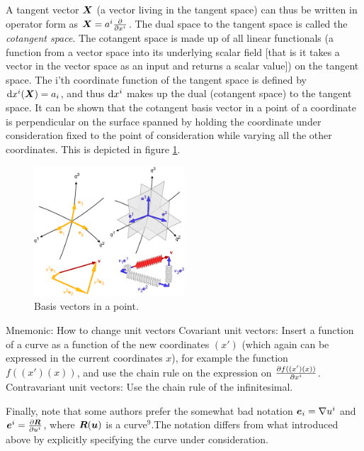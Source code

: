 \documentclass[a4paper, 12pt]{article}
\begin{document}
A tangent vector $\boldsymbol{X}$ (a vector living in the tangent space) can thus be 
written in operator form as $\boldsymbol{X}=a^i\frac{\partial {}}{\partial{x^{i}}}$. The dual space to 
the tangent space is called the \emph{cotangent space}. The cotangent space is 
made up of all linear functionals (a function from a vector space into its 
underlying scalar field [that is it takes a vector in the vector space as an 
input and returns a scalar value]) on the tangent space. The i'th coordinate 
function of the tangent space is defined by $\text{d} x^i(\boldsymbol{X}) = a_i$, and thus $\text{d} 
x^i$ makes up the dual (cotangent space) to the tangent space. It can be shown 
that the cotangent basis vector in a point of a coordinate is perpendicular on 
the surface spanned by holding the coordinate under consideration fixed to the 
point of consideration while varying all the other coordinates. This is 
depicted 
in figure \ref{fig:basis}.
%
\begin{figure}[h!]
\center
 \includegraphics[width=0.5\textwidth]{figures/co-contra}
 \caption{Basis vectors in a point.}
 \label{fig:basis}
\end{figure}

\vspace{0.5cm}
\begin{greenbox}{Mnemonic: How to change unit vectors}
 Covariant unit vectors: Insert a function of a curve as a function of the new 
 coordinates $(x')$ (which again can be expressed in the current coordinates 
 $x$), for example the function $f((x')(x))$, and use the chain rule on the 
 expression on $\frac{\partial {f((x')(x))}}{\partial{x^i}}$.\\
 Contravariant unit vectors: Use the chain rule of the infinitesimal.
\end{greenbox}
%
Finally, note that some authors prefer the somewhat bad notation $\boldsymbol{e}_i = 
\nabla u^i$ and $\boldsymbol{e}^i = \frac{\partial {\boldsymbol{R}}}{\partial{u^i}}$, where $\boldsymbol{R}(\boldsymbol{u})$ is a 
curve\hyperref[note:curve]{$^9$}.The notation differs from what introduced 
above by explicitly specifying the curve under consideration.
\end{document}
